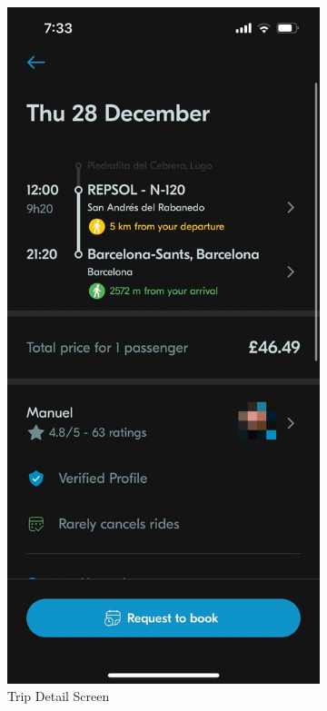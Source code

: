 \documentclass[a4paper, 12pt]{report} %
\begin{document}
\begin{figure}
\begin{subfigure}{0.3\textwidth}
                        \includegraphics[width=0.8\linewidth, height=0.9\textheight, keepaspectratio]{Images/Blablacar_trip_detail.png}  
                        \caption{Trip Detail Screen}
                        \label{fig:blabla_detail}
                    \end{subfigure}
                    \newline %
                    \newline
                    \begin{subfigure}{0.3\textwidth}

\end{subfigure}
\end{figure}
\end{document}

